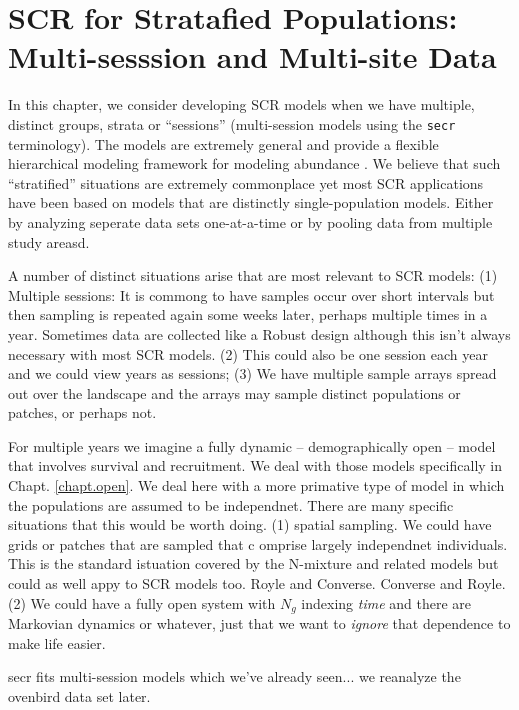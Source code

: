 \chapter{SCR for Stratafied Populations: 
Multi-sesssion and Multi-site Data}
\label{chapt.hscr}

\vspace{0.3cm}


In this chapter, we consider developing SCR models when we have
multiple, distinct groups, strata or ``sessions'' (multi-session
models using the \mbox{\tt secr} terminology). The models are
extremely general and provide a flexible hierarchical modeling
framework for modeling abundance \citep{converse_royle:2012,
  royle_etal:2012arXiv}.  We believe that such ``stratified''
situations are extremely commonplace yet most SCR applications have
been based on models that are distinctly single-population
models. Either by analyzing seperate data sets one-at-a-time or by
pooling data from multiple study areasd.

A number of distinct situations arise that are most relevant to SCR
models: (1) Multiple sessions: It is commong to have samples occur
over short intervals but then sampling is repeated again some weeks
later, perhaps multiple times in a year.  Sometimes data are collected
like a Robust design although this isn't always necessary with most
SCR models.  (2) This could also be one session each year and we could
view years as sessions; (3) We have multiple sample arrays spread out
over the landscape and the arrays may sample distinct populations or
patches, or perhaps not.

For multiple years we imagine a fully dynamic -- demographically open
-- model that involves survival and recruitment. We deal with those
models specifically in Chapt. \ref{chapt.open}.
We deal here with a more primative type of model in which the
populations are assumed to be independnet.  There are many specific
situations that this would be worth doing.
(1) spatial sampling. We could have grids or patches that are sampled
that c omprise largely independnet individuals. This is the standard
istuation covered by the N-mixture and related models but could as
well appy to SCR models too. Royle and Converse. Converse and Royle.
(2) We could have a fully open system with $N_{g}$ indexing {\it time}
and there are Markovian dynamics or whatever, just that we want to
{\it ignore} that dependence to make life easier.

secr fits multi-session models which we've already seen... we
reanalyze the ovenbird data set later.


